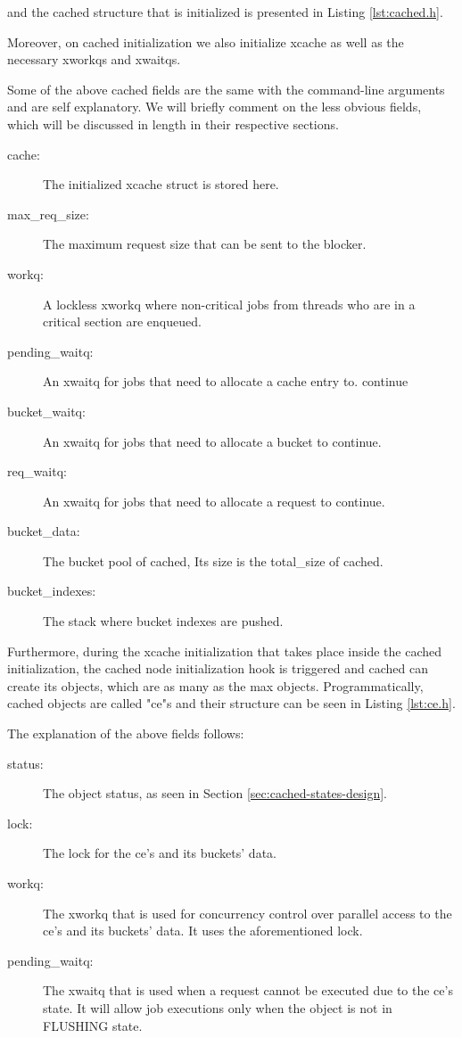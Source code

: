 and the cached structure that is initialized is presented in Listing 
\ref{lst:cached.h}. 


Moreover, on cached initialization we also initialize xcache as well as the 
necessary xworkqs and xwaitqs.

Some of the above cached fields are the same with the command-line arguments 
and are self explanatory. We will briefly comment on the less obvious fields, 
which will be discussed in length in their respective sections.

\begin{description}
	\item[cache:]
		The initialized xcache struct is stored here.
	\item[max\_req\_size:]
		The maximum request size that can be sent to the blocker.
	\item[workq:]
		A lockless xworkq where non-critical jobs from threads who are 
		in a critical section are enqueued.
	\item[pending\_waitq:]
		An xwaitq for jobs that need to allocate a cache entry to.
		continue
	\item[bucket\_waitq:]
		An xwaitq for jobs that need to allocate a bucket to continue.
	\item[req\_waitq:]
		An xwaitq for jobs that need to allocate a request to continue.
	\item[bucket\_data:]
		The bucket pool of cached, Its size is the total\_size of 
		cached.
	\item[bucket\_indexes:]
		The stack where bucket indexes are pushed.
\end{description}

Furthermore, during the xcache initialization that takes place inside the 
cached initialization, the cached node initialization hook is triggered and 
cached can create its objects, which are as many as the max objects.  
Programmatically, cached objects are called "ce"s and their structure can be 
seen in Listing \ref{lst:ce.h}.


The explanation of the above fields follows:

\begin{description}
	\item[status:] The object status, as seen in Section 
		\ref{sec:cached-states-design}.
	\item[lock:] The lock for the ce's and its buckets' data.
	\item[workq:] The xworkq that is used for concurrency control over 
		parallel access to the ce's and its buckets' data. It uses the 
		aforementioned lock.
	\item[pending\_waitq:] The xwaitq that is used when a request cannot be 
		executed due to the ce's state. It will allow job executions 
		only when the object is not in FLUSHING state.
\end{description}

